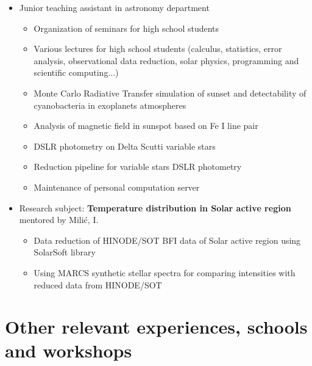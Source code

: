 \documentclass[12p,a4paper,sans]{moderncv}        %
\begin{document}
	{
	\begin{itemize}
		\item{Junior teaching assistant in astronomy department}		
		\begin{itemize}
			\item {Organization of seminars for high school students}
			\item {Various lectures for high school students (calculus, statistics, error analysis, observational data reduction, solar physics, programming and scientific computing...)}
			\item{Monte Carlo Radiative Transfer simulation of sunset and detectability of cyanobacteria in exoplanets atmospheres}
			\item{Analysis of magnetic field in sunspot based on Fe I line pair}
			\item{DSLR photometry on Delta Scutti variable stars}
			\item{Reduction pipeline for variable stars DSLR photometry}
			\item{Maintenance of personal computation server}
		\end{itemize}				
	\end{itemize}			
	}


	{
    	\begin{itemize}
            \item{Research subject: \textbf{Temperature distribution in Solar active region} mentored by Milić, I.}
            \begin{itemize}
				\item{Data reduction of HINODE/SOT BFI data of Solar active region using SolarSoft library}
                \item{Using MARCS synthetic stellar spectra for comparing intensities with reduced data from HINODE/SOT}
			\end{itemize}
		\end{itemize}
    }


\section{Other relevant experiences, schools and workshops}
	
\end{document}
